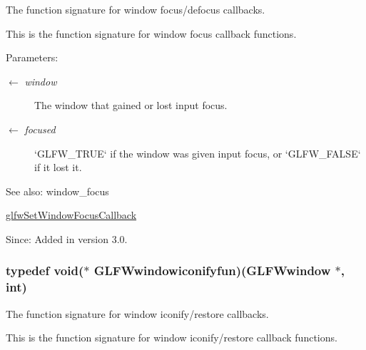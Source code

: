The function signature for window focus/defocus callbacks. 

This is the function signature for window focus callback functions.

\begin{Desc}
\item[Parameters:]
\begin{description}
\item[\mbox{$\leftarrow$} {\em window}]The window that gained or lost input focus. \item[\mbox{$\leftarrow$} {\em focused}]`GLFW\_\-TRUE` if the window was given input focus, or `GLFW\_\-FALSE` if it lost it.\end{description}
\end{Desc}
\begin{Desc}
\item[See also:]window\_\-focus 

\hyperlink{group__window_gc89c6534ba7fbab6f6c68b855656c0d4}{glfwSetWindowFocusCallback}\end{Desc}
\begin{Desc}
\item[Since:]Added in version 3.0. \end{Desc}
\hypertarget{group__window_ge47ae066eea9fe6050a62360928ae524}{
\subsubsection[GLFWwindowiconifyfun]{\setlength{\rightskip}{0pt plus 5cm}typedef void($\ast$  {\bf GLFWwindowiconifyfun})({\bf GLFWwindow} $\ast$, int)}}
\label{group__window_ge47ae066eea9fe6050a62360928ae524}


The function signature for window iconify/restore callbacks. 

This is the function signature for window iconify/restore callback functions.

